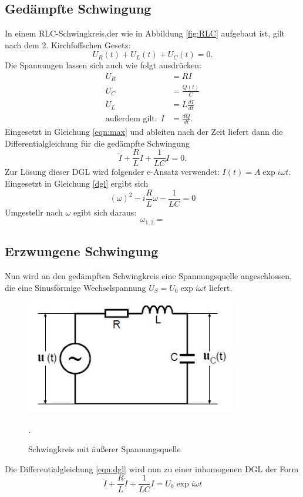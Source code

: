 \subsection{Gedämpfte Schwingung}
In einem RLC-Schwingkreis,der wie in Abbildung \ref{fig:RLC} aufgebaut ist, gilt nach dem
2. Kirchfoffschen Gesetz:
\begin{equation}
  U_{R}(t)+U_{L}(t)+U_{C}(t)=0.
  \label{eqn:max}
\end{equation}
Die Spannungen lassen sich auch wie folgt ausdrücken:
\begin{align}
  U_{R}&=RI\\
  U_{C}&=\frac{Q(t)}{C}\\
  U_{L}&=L\frac{dI}{dt}\\
\text{außerdem gilt:}\:\:I&=\frac{dQ}{dt}.
\end{align}
Eingesetzt in Gleichung \ref{eqn:max} und ableiten nach der Zeit liefert dann die Differentialgleichung
für die gedämpfte Schwingung
\begin{equation}
  \ddot{I}+\frac{R}{L}\dot{I}+\frac{1}{LC}I=0.
  \label{dgl}
\end{equation}
Zur Lösung dieser DGL wird folgender e-Ansatz verwendet: $I(t)=A\exp{i \omega t}$.
Eingesetzt in Gleichung \ref{dgl} ergibt sich
\begin{equation}
  (\omega)^2 -i\frac{R}{L}\omega -\frac{1}{LC}=0
  \label{dgll}
\end{equation}
Umgestellr nach $\omega$ egibt sich daraus:
\begin{equation}
  \omega_{1,2}=
\end{equation}

\subsection{Erzwungene Schwingung}
Nun wird an den gedämpften Schwingkreis eine Spannungsquelle angeschlossen, die
eine Sinusförmige Wechselspannung $U_{S}=U_{0}\exp{i\omega t}$ liefert.
\begin{figure}[H]
  \centering
  \includegraphics[height=5cm]{erzw.JPG}
  \caption{Schwingkreis mit äußerer Spannungsquelle}
  \cite{skript}.
  \label{fig:erzw}
\end{figure}
Die Differentialgleichung \ref{eqn:dgl} wird nun zu einer inhomogenen DGL der Form
\begin{equation}
  \ddot{I}+\frac{R}{L}\dot{I}+\frac{1}{LC}I=U_{0}\exp{i\omega t}
  \label{eqn:erzwdgl}
\end{equation}






\label{sec:Theorie}

